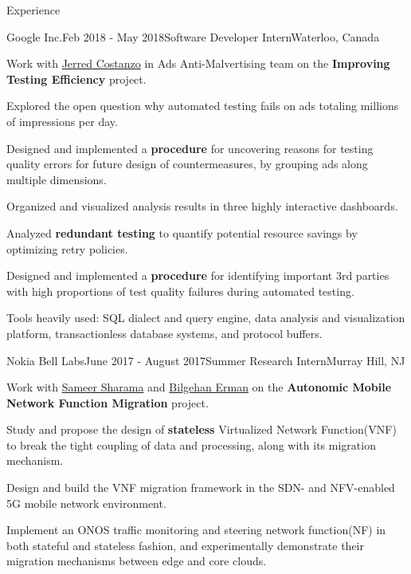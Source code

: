 \documentclass{resume} %
\begin{document}
\begin{rSection}{Experience}

\begin{rSubsection}{Google Inc.}{Feb 2018 - May 2018}{Software Developer Intern}{Waterloo, Canada}
\item Work with \href{https://moma.corp.google.com/person/jerred}{Jerred Costanzo} in Ads Anti-Malvertising team on the \textbf{Improving Testing Efficiency} project.
\item Explored the open question why automated testing fails on ads totaling millions of impressions per day.
\item Designed and implemented a \textbf{procedure} for uncovering reasons for testing quality errors for future design of countermeasures, by grouping ads along multiple dimensions.
\item Organized and visualized analysis results in three highly interactive dashboards.
\item Analyzed \textbf{redundant testing} to quantify potential resource savings by optimizing retry policies.
\item Designed and implemented a \textbf{procedure} for identifying important 3rd parties with high proportions of test quality failures during automated testing.
\item Tools heavily used: SQL dialect and query engine, data analysis and visualization platform, transactionless database systems, and protocol buffers.
\end{rSubsection}

\begin{rSubsection}{Nokia Bell Labs}{June 2017 - August 2017}{Summer Research Intern}{Murray Hill, NJ}
\item Work with \href{https://www.bell-labs.com/usr/sameer.sharma}{Sameer Sharama} and \href{https://www.bell-labs.com/usr/bilgehan.erman}{Bilgehan Erman} on the \textbf{Autonomic Mobile Network Function Migration} project.
\item Study and propose the design of \textbf{stateless} Virtualized Network Function(VNF) to break the tight coupling of data and processing, along with its migration mechanism.
\item Design and build the VNF migration framework in the SDN- and NFV-enabled 5G mobile network environment.
\item Implement an ONOS traffic monitoring and steering network function(NF) in both stateful and stateless fashion, and experimentally demonstrate their migration mechanisms between edge and core clouds.
\end{rSubsection}


\end{rSection}
\end{document}
